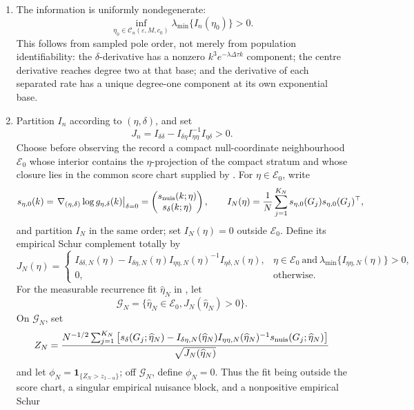 \begin{paperthm}
\begin{enumerate}[label=\textup{(\roman*)},leftmargin=2.6em]
\item The information is uniformly nondegenerate:
\[
 \inf_{\eta_0\in\mathcal C_n(\varepsilon,M,c_0)}
 \lambda_{\min}\{I_n(\eta_0)\}>0.
\tag{SC16}
\]
This follows from sampled pole order, not merely from population
identifiability: the \(\delta\)-derivative has a nonzero
\(k^3e^{-\lambda\Delta\tau k}\) component; the centre derivative reaches
degree two at that base; and the derivative of each separated rate has a
unique degree-one component at its own exponential base.

\item Partition \(I_n\) according to \((\eta,\delta)\), and set
\[
 J_n=I_{\delta\delta}
 -I_{\delta\eta}I_{\eta\eta}^{-1}I_{\eta\delta}>0.
\tag{SC17}
\]
Choose before observing the record a compact null-coordinate neighbourhood
\(\mathcal E_0\) whose interior contains the \(\eta\)-projection of the
compact stratum and whose closure lies in the common score chart supplied by
.  For \(\eta\in\mathcal E_0\),
write
\[
 s_{\eta,0}(k)
 =\left.\nabla_{(\eta,\delta)}\log g_{\eta,\delta}(k)
   \right|_{\delta=0}
 =\begin{pmatrix}s_{\rm nuis}(k;\eta)\\s_\delta(k;\eta)\end{pmatrix},
 \qquad
 I_N(\eta)=\frac1N\sum_{j=1}^{K_N}
 s_{\eta,0}(G_j)s_{\eta,0}(G_j)^\top,
\]
and partition \(I_N\) in the same order; set \(I_N(\eta)=0\) outside
\(\mathcal E_0\).  Define its empirical Schur complement totally by
\[
 J_N(\eta)=
 \begin{cases}
 I_{\delta\delta,N}(\eta)
 -I_{\delta\eta,N}(\eta)I_{\eta\eta,N}(\eta)^{-1}
  I_{\eta\delta,N}(\eta),
 &\eta\in\mathcal E_0\ \text{and}\
  \lambda_{\min}\{I_{\eta\eta,N}(\eta)\}>0,\\
 0,&\text{otherwise}.
 \end{cases}
\]
For the measurable recurrence fit \(\widehat\eta_N\) in
, let
\[
 \mathcal G_N=\{\widehat\eta_N\in\mathcal E_0,
                 J_N(\widehat\eta_N)>0\}.
\]
On \(\mathcal G_N\), set
\[
 Z_N=\frac{N^{-1/2}\sum_{j=1}^{K_N}
 \left[s_\delta(G_j;\widehat\eta_N)
 -I_{\delta\eta,N}(\widehat\eta_N)
  I_{\eta\eta,N}(\widehat\eta_N)^{-1}
  s_{\rm nuis}(G_j;\widehat\eta_N)\right]}
 {\sqrt{J_N(\widehat\eta_N)}}
\]
and let \(\phi_N=\mathbf1_{\{Z_N>z_{1-\alpha}\}}\); off
\(\mathcal G_N\), define \(\phi_N=0\).  Thus the fit being outside the score
chart, a singular empirical nuisance block, and a nonpositive empirical Schur

\end{enumerate}
\end{paperthm}
